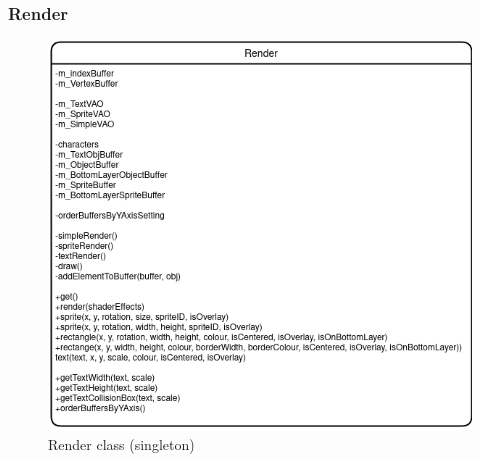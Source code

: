 \documentclass{article}
\begin{document}
            \subsubsection{Render}
                \begin{figure}[hbt!]
                    \centerline{\includegraphics[scale=0.5]{img/Classes/Render.png}}
                    \caption{Render class (singleton)}
                    \label{fig}
                \end{figure}
\end{document}
